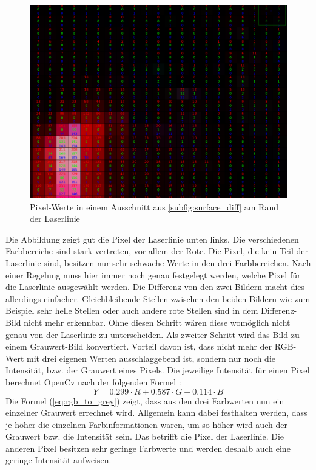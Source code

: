 	\begin{figure}[h]
		\centering
		\includegraphics[width=0.75\linewidth]{img/hauptteil/bildverarbeitung/pixel_values.png}
		\caption[Pixel-Werte der Laserlinie]{Pixel-Werte in einem Ausschnitt aus \ref{subfig:surface_diff} am Rand der Laserlinie}
		\label{fig:pix_values}
	\end{figure} 
	
	Die Abbildung zeigt gut die Pixel der Laserlinie unten links. Die verschiedenen Farbbereiche sind stark vertreten, vor allem der Rote. Die Pixel, die kein Teil der Laserlinie sind, besitzen nur sehr schwache Werte in den drei Farbbereichen. Nach einer Regelung muss hier immer noch genau festgelegt werden, welche Pixel für die Laserlinie ausgewählt werden. Die Differenz von den zwei Bildern macht dies allerdings einfacher. Gleichbleibende Stellen zwischen den beiden Bildern wie zum Beispiel sehr helle Stellen oder auch andere rote Stellen sind in dem Differenz-Bild nicht mehr erkennbar. Ohne diesen Schritt wären diese womöglich nicht genau von der Laserlinie zu unterscheiden. \newline
	Als zweiter Schritt wird das Bild zu einem Grauwert-Bild konvertiert. Vorteil davon ist, dass nicht mehr der RGB-Wert mit drei eigenen Werten ausschlaggebend ist, sondern nur noch die Intensität, bzw. der Grauwert eines Pixels. Die jeweilige Intensität für einen Pixel berechnet OpenCv nach der folgenden Formel \cite[Vgl.][]{noauthor_opencv_nodate}:
	\begin{equation}
	Y = 0.299 \cdot R + 0.587 \cdot G + 0.114 \cdot B
	\label{eq:rgb_to_grey}
	\end{equation}
	Die Formel (\ref{eq:rgb_to_grey}) zeigt, dass aus den drei Farbwerten nun ein einzelner Grauwert errechnet wird. Allgemein kann dabei festhalten werden, dass je höher die einzelnen Farbinformationen waren, um so höher wird auch der Grauwert bzw. die Intensität sein. Das betrifft die Pixel der Laserlinie. Die anderen Pixel besitzen sehr geringe Farbwerte und werden deshalb auch eine geringe Intensität aufweisen. 
	
